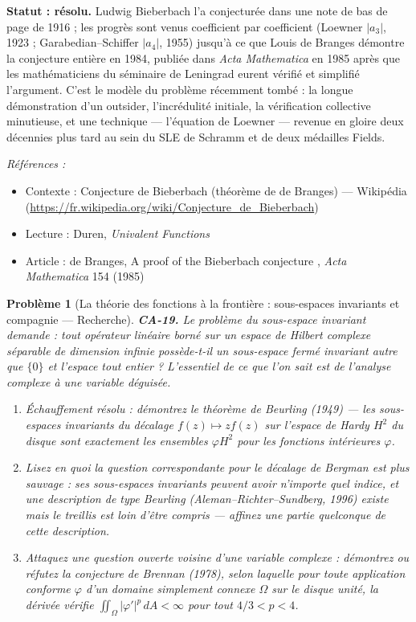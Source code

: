 \documentclass[11pt]{article}
\newtheorem{problem}{Problème}
\newenvironment{refs}{\par\small\noindent\emph{Références :}\begin{itemize}\setlength\itemsep{0pt}}{\end{itemize}\normalsize}
\begin{document}
\noindent \textbf{Statut : résolu.} Ludwig Bieberbach l'a conjecturée dans une note de bas
de page de 1916 ; les progrès sont venus coefficient par coefficient (Loewner $ |a_3| $, 1923 ;
Garabedian--Schiffer $ |a_4| $, 1955) jusqu'à ce que Louis de Branges démontre la conjecture
entière en 1984, publiée dans \textit{Acta Mathematica} en 1985 après que les mathématiciens du
séminaire de Leningrad eurent vérifié et simplifié l'argument. C'est le modèle du problème
\og{} récemment tombé \fg{} : la longue démonstration d'un outsider, l'incrédulité initiale, la vérification
collective minutieuse, et une technique --- l'équation de Loewner --- revenue en gloire deux décennies
plus tard au sein du SLE de Schramm et de deux médailles Fields.

\begin{refs}
\item Contexte : Conjecture de Bieberbach (théorème de de Branges) --- Wikipédia (\url{https://fr.wikipedia.org/wiki/Conjecture_de_Bieberbach})
\item Lecture : Duren, \textit{Univalent Functions}
\item Article : de Branges, \og{} A proof of the Bieberbach conjecture \fg{}, \textit{Acta Mathematica} 154 (1985)
\end{refs}

\bigskip

\begin{problem}[{La théorie des fonctions à la frontière : sous-espaces invariants et compagnie --- Recherche}]
\textbf{CA-19.} Le problème du sous-espace invariant demande : tout opérateur
linéaire borné sur un espace de Hilbert complexe séparable de dimension infinie possède-t-il un
sous-espace fermé invariant autre que $ \{0\} $ et l'espace tout entier ? L'essentiel de ce que
l'on sait est de l'analyse complexe à une variable déguisée.
\begin{enumerate}
\item[(a)] Échauffement résolu : démontrez le théorème de Beurling
(1949) --- les sous-espaces invariants du décalage $ f(z) \mapsto z f(z) $ sur l'espace de Hardy
$ H^2 $ du disque sont exactement les ensembles $ \varphi H^2 $ pour les fonctions intérieures
$ \varphi $.
\item[(b)] Lisez en quoi la question correspondante pour le décalage de \textit{Bergman} est plus sauvage :
ses sous-espaces invariants peuvent avoir n'importe quel indice, et une description de type
Beurling (Aleman--Richter--Sundberg, 1996) existe mais le treillis est loin d'être compris ---
affinez une partie quelconque de cette description.
\item[(c)] Attaquez une question ouverte voisine d'une variable complexe :
démontrez ou réfutez la conjecture de Brennan (1978), selon laquelle pour toute application conforme
$ \varphi $ d'un domaine simplement connexe $ \Omega $ sur le disque unité, la dérivée vérifie
$ \iint_\Omega |\varphi'|^p \,dA < \infty $ pour tout $ 4/3 < p < 4 $.
\end{enumerate}

\end{problem}
\end{document}
